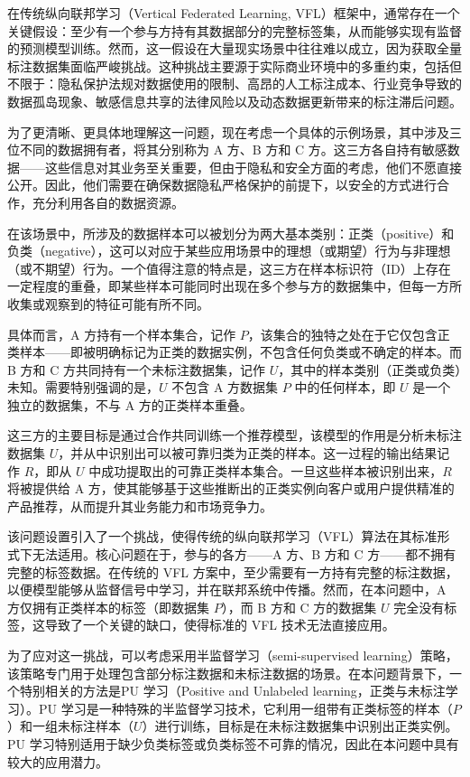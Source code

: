 在传统纵向联邦学习（Vertical Federated Learning, VFL）框架中，通常存在一个关键假设：至少有一个参与方持有其数据部分的完整标签集，从而能够实现有监督的预测模型训练。然而，这一假设在大量现实场景中往往难以成立，因为获取全量标注数据集面临严峻挑战。这种挑战主要源于实际商业环境中的多重约束，包括但不限于：隐私保护法规对数据使用的限制、高昂的人工标注成本、行业竞争导致的数据孤岛现象、敏感信息共享的法律风险以及动态数据更新带来的标注滞后问题。

为了更清晰、更具体地理解这一问题，现在考虑一个具体的示例场景，其中涉及三位不同的数据拥有者，将其分别称为 A 方、B 方和 C 方。这三方各自持有敏感数据——这些信息对其业务至关重要，但由于隐私和安全方面的考虑，他们不愿直接公开。因此，他们需要在确保数据隐私严格保护的前提下，以安全的方式进行合作，充分利用各自的数据资源。

在该场景中，所涉及的数据样本可以被划分为两大基本类别：正类（positive）和负类（negative），这可以对应于某些应用场景中的理想（或期望）行为与非理想（或不期望）行为。一个值得注意的特点是，这三方在样本标识符（ID）上存在一定程度的重叠，即某些样本可能同时出现在多个参与方的数据集中，但每一方所收集或观察到的特征可能有所不同。

具体而言，A 方持有一个样本集合，记作 $ P $，该集合的独特之处在于它仅包含正类样本——即被明确标记为正类的数据实例，不包含任何负类或不确定的样本。而 B 方和 C 方共同持有一个未标注数据集，记作 $ U $，其中的样本类别（正类或负类）未知。需要特别强调的是，$ U $ 不包含 A 方数据集 $ P $ 中的任何样本，即 $ U $ 是一个独立的数据集，不与 A 方的正类样本重叠。

这三方的主要目标是通过合作共同训练一个推荐模型，该模型的作用是分析未标注数据集 $ U $，并从中识别出可以被可靠归类为正类的样本。这一过程的输出结果记作 $ R $，即从 $ U $ 中成功提取出的可靠正类样本集合。一旦这些样本被识别出来，$ R $ 将被提供给 A 方，使其能够基于这些推断出的正类实例向客户或用户提供精准的产品推荐，从而提升其业务能力和市场竞争力。

该问题设置引入了一个挑战，使得传统的纵向联邦学习（VFL）算法在其标准形式下无法适用。核心问题在于，参与的各方——A 方、B 方和 C 方——都不拥有完整的标签数据。在传统的 VFL 方案中，至少需要有一方持有完整的标注数据，以便模型能够从监督信号中学习，并在联邦系统中传播。然而，在本问题中，A 方仅拥有正类样本的标签（即数据集 $ P $），而 B 方和 C 方的数据集 $ U $ 完全没有标签，这导致了一个关键的缺口，使得标准的 VFL 技术无法直接应用。

为了应对这一挑战，可以考虑采用半监督学习（semi-supervised learning）策略，该策略专门用于处理包含部分标注数据和未标注数据的场景。在本问题背景下，一个特别相关的方法是PU 学习（Positive and Unlabeled learning，正类与未标注学习）。PU 学习是一种特殊的半监督学习技术，它利用一组带有正类标签的样本（$ P $）和一组未标注样本（$ U $）进行训练，目标是在未标注数据集中识别出正类实例。PU 学习特别适用于缺少负类标签或负类标签不可靠的情况，因此在本问题中具有较大的应用潜力。

